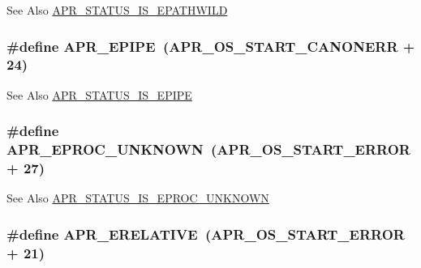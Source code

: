 \begin{DoxySeeAlso}{See Also}
\hyperlink{group___a_p_r___s_t_a_t_u_s___i_s_gae23aedf7ad4e6a111ffd6acf4167b00e}{A\-P\-R\-\_\-\-S\-T\-A\-T\-U\-S\-\_\-\-I\-S\-\_\-\-E\-P\-A\-T\-H\-W\-I\-L\-D} 
\end{DoxySeeAlso}
\hypertarget{group___a_p_r___error_gae985330e30e374714ff1742485597f5d}{
\subsubsection[{A\-P\-R\-\_\-\-E\-P\-I\-P\-E}]{\setlength{\rightskip}{0pt plus 5cm}\#define A\-P\-R\-\_\-\-E\-P\-I\-P\-E~({\bf A\-P\-R\-\_\-\-O\-S\-\_\-\-S\-T\-A\-R\-T\-\_\-\-C\-A\-N\-O\-N\-E\-R\-R} + 24)}}\label{group___a_p_r___error_gae985330e30e374714ff1742485597f5d}
\begin{DoxySeeAlso}{See Also}
\hyperlink{group___a_p_r___s_t_a_t_u_s___i_s_gad1c0cf4e5619025a87c8edfc668d49f6}{A\-P\-R\-\_\-\-S\-T\-A\-T\-U\-S\-\_\-\-I\-S\-\_\-\-E\-P\-I\-P\-E} 
\end{DoxySeeAlso}
\hypertarget{group___a_p_r___error_ga01b21dc62b410707f44641d3cea3e6ed}{
\subsubsection[{A\-P\-R\-\_\-\-E\-P\-R\-O\-C\-\_\-\-U\-N\-K\-N\-O\-W\-N}]{\setlength{\rightskip}{0pt plus 5cm}\#define A\-P\-R\-\_\-\-E\-P\-R\-O\-C\-\_\-\-U\-N\-K\-N\-O\-W\-N~({\bf A\-P\-R\-\_\-\-O\-S\-\_\-\-S\-T\-A\-R\-T\-\_\-\-E\-R\-R\-O\-R} + 27)}}\label{group___a_p_r___error_ga01b21dc62b410707f44641d3cea3e6ed}
\begin{DoxySeeAlso}{See Also}
\hyperlink{group___a_p_r___s_t_a_t_u_s___i_s_gab1267636d1f3fe0dcb79a22b735a5010}{A\-P\-R\-\_\-\-S\-T\-A\-T\-U\-S\-\_\-\-I\-S\-\_\-\-E\-P\-R\-O\-C\-\_\-\-U\-N\-K\-N\-O\-W\-N} 
\end{DoxySeeAlso}
\hypertarget{group___a_p_r___error_gae4688dfa866265b9ec3623689c23923b}{
\subsubsection[{A\-P\-R\-\_\-\-E\-R\-E\-L\-A\-T\-I\-V\-E}]{\setlength{\rightskip}{0pt plus 5cm}\#define A\-P\-R\-\_\-\-E\-R\-E\-L\-A\-T\-I\-V\-E~({\bf A\-P\-R\-\_\-\-O\-S\-\_\-\-S\-T\-A\-R\-T\-\_\-\-E\-R\-R\-O\-R} + 21)}}\label{group___a_p_r___error_gae4688dfa866265b9ec3623689c23923b}
